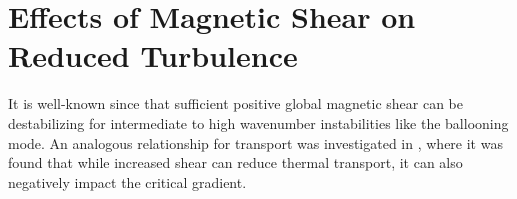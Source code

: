 \documentclass{jpp}
\begin{document}
\section{Effects of Magnetic Shear on Reduced Turbulence}\label{Mechanisms for Reduced Turbulence}




It is well-known since \citet{Greene1981TheModes} that sufficient positive global magnetic shear can be destabilizing for intermediate to high wavenumber instabilities like the ballooning mode. An analogous relationship for transport was investigated in \citet{Kotschenreuther1995QuantitativeEffects}, where it was found that while increased shear can reduce thermal transport, it can also negatively impact the critical gradient.
\end{document}
